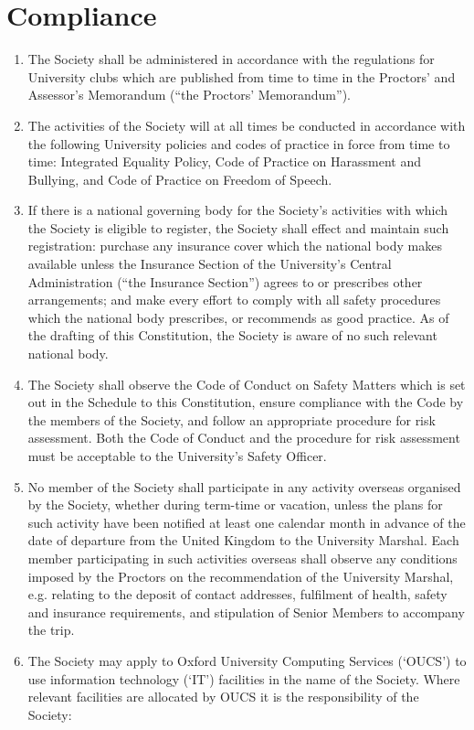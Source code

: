 \documentclass[11pt]{article}
\begin{document}
\section{Compliance}
\begin{enumerate}
\item The Society shall be administered in accordance with the regulations for University clubs which are published from time to time in the Proctors' and Assessor's Memorandum (``the Proctors' Memorandum'').
\item The activities of the Society will at all times be conducted in accordance with the following University policies and codes of practice in force from time to time: Integrated Equality Policy, Code of Practice on Harassment and Bullying, and Code of Practice on Freedom of Speech.
\item If there is a national governing body for the Society's activities with which the Society is eligible to register, the Society shall effect and maintain such registration: purchase any insurance cover which the national body makes available unless the Insurance Section of the University's Central Administration (``the Insurance Section'') agrees to or prescribes other arrangements; and make every effort to comply with all safety procedures which the national body prescribes, or recommends as good practice.
\subitem As of the drafting of this Constitution, the Society is aware of no such relevant national body.
\item The Society shall observe the Code of Conduct on Safety Matters which is set out in the Schedule to this Constitution, ensure compliance with the Code by the members of the Society, and follow an appropriate procedure for risk assessment. Both the Code of Conduct and the procedure for risk assessment must be acceptable to the University's Safety Officer.
\item No member of the Society shall participate in any activity overseas organised by the Society, whether during term-time or vacation, unless the plans for such activity have been notified at least one calendar month in advance of the date of departure from the United Kingdom to the University Marshal. Each member participating in such activities overseas shall observe any conditions imposed by the Proctors on the recommendation of the University Marshal, e.g. relating to the deposit of contact addresses, fulfilment of health, safety and insurance requirements, and stipulation of Senior Members to accompany the trip.
\item The Society may apply to Oxford University Computing Services (`OUCS') to use information technology (`IT') facilities in the name of the Society. Where relevant facilities are allocated by OUCS it is the responsibility of the Society:

\end{enumerate}
\end{document}
